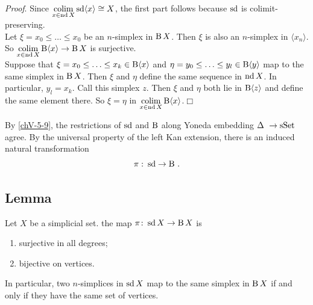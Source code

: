         \emph{Proof}. Since $\operatorname*{colim}\limits_{x \in \operatorname{nd} X} \operatorname{sd} \langle x \rangle \cong X$, the first part follows because $\operatorname{sd}$ is colimit-preserving.\\
        Let $\xi = x_0 \leq \ldots \leq x_0$ be an $n$-simplex in $\operatorname{B} X$. Then $\xi$ is also an $n$-simplex in $\langle x_n \rangle$. So $\operatorname*{colim}\limits_{x \in \operatorname{nd} X} \operatorname{B} \langle x \rangle \to \operatorname{B} X$ is surjective.\\
        Suppose that $\xi = x_0 \leq \ldots \leq x_k \in \operatorname{B} \langle x \rangle$ and $\eta = y_0 \leq \ldots \leq y_l \in \operatorname{B} \langle y \rangle$ map to the same simplex in $\operatorname{B} X$. Then $\xi$ and $\eta$ define the same sequence in $\operatorname{nd} X$. In particular, $y_l = x_k$. Call this simplex $z$. Then $\xi$ and $\eta$ both lie in $\operatorname{B} \langle z \rangle$ and define the same element there. So $\xi = \eta$ in $\operatorname*{colim}\limits_{x \in \operatorname{nd} X} \operatorname{B} \langle x \rangle$.\hfill$\Box$
        \medskip

        By \ref{chV-5-9}, the restrictions of $\operatorname{sd}$ and $\operatorname{B}$ along Yoneda embedding $\Delta \ \to \operatorname{sSet}$ agree. By the universal property of the left Kan extension, there is an induced natural transformation
        \begin{equation*}
            \pi \,\colon \operatorname{sd} \to \operatorname{B} \,.
        \end{equation*}

    \subsection{Lemma}\label{chV-5-14}
        Let $X$ be a simplicial set. the map $\pi \colon \operatorname{sd} X \to \operatorname{B} X$ is
        \begin{enumerate}[label=\roman*)]
            \item 
                surjective in all degrees;
            \item 
                bijective on vertices.
        \end{enumerate}
        In particular, two $n$-simplices in $\operatorname{sd} X$ map to the same simplex in $\operatorname{B} X$ if and only if they have the same set of vertices.
        \smallskip

